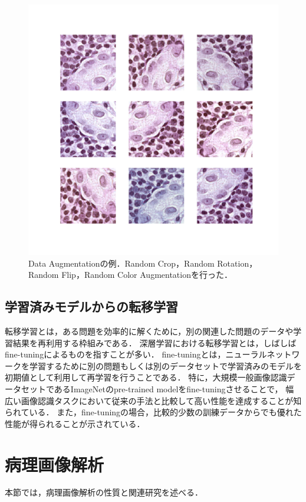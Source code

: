 \begin{figure}[tbp]
     \begin{center}
      \includegraphics[width=12cm]{figures/data_augmentation.pdf}
     \end{center}
    \caption{\label{fig:data_augmentation}Data Augmentationの例．Random Crop，Random Rotation，Random Flip，Random Color Augmentationを行った．}
\end{figure}

\subsection{学習済みモデルからの転移学習}
\label{sec:transfer}
転移学習とは，ある問題を効率的に解くために，別の関連した問題のデータや学習結果を再利用する枠組みである．
深層学習における転移学習とは，しばしばfine-tuningによるものを指すことが多い．
fine-tuningとは，ニューラルネットワークを学習するために別の問題もしくは別のデータセットで学習済みのモデルを初期値として利用して再学習を行うことである．
特に，大規模一般画像認識データセットであるImageNet\cite{imagenet_cvpr09}のpre-trained modelをfine-tuningさせることで，
幅広い画像認識タスクにおいて従来の手法と比較して高い性能を達成することが知られている\cite{girshick2014rich, agrawal2014analyzing}．
また，fine-tuningの場合，比較的少数の訓練データからでも優れた性能が得られることが示されている．

\section{病理画像解析}
本節では，病理画像解析の性質と関連研究を述べる．

